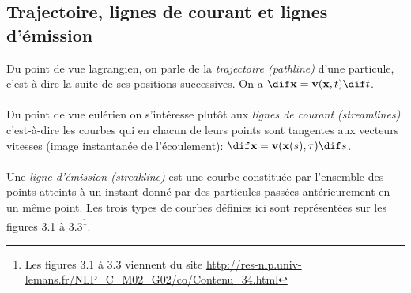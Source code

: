 \subsection{Trajectoire, lignes de courant et lignes d'émission}
Du point de vue lagrangien, on parle de la \emph{trajectoire (pathline)} d'une particule, c'est-à-dire la suite de ses positions successives. On a $\dif\fv{x}=\fv{v}(\fv{x},t)\dif t$.
\paragraph{}
Du point de vue eulérien on s'intéresse plutôt aux \emph{lignes de courant (streamlines)} c'est-à-dire les courbes qui en chacun de leurs points sont tangentes aux vecteurs vitesses (image instantanée de l'écoulement): $\dif\fv{x}=\fv{v}(\fv{x}(s),\tau)\dif s$.
\paragraph{}
Une \emph{ligne d'émission (streakline)} est une courbe constituée par l'ensemble des points atteints à un instant donné par des particules passées antérieurement en un même point. Les trois types de courbes définies ici sont représentées sur les figures 3.1 à 3.3\footnote{Les figures 3.1 à 3.3 viennent du site \url{http://res-nlp.univ-lemans.fr/NLP_C_M02_G02/co/Contenu_34.html}}.
